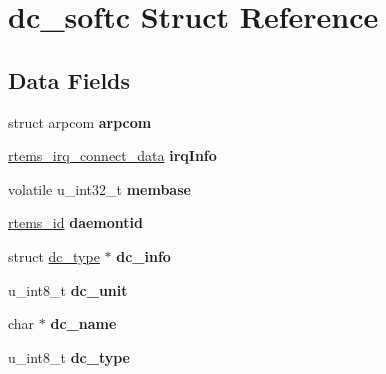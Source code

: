 \hypertarget{structdc__softc}{}\section{dc\+\_\+softc Struct Reference}
\label{structdc__softc}
\subsection*{Data Fields}
\begin{DoxyCompactItemize}
\item 
\mbox{\label{structdc__softc_aa35ea145016c40617c2cdd04aea78a62}} 
struct arpcom {\bfseries arpcom}
\item 
\mbox{\label{structdc__softc_ad37829419b117504c1aa75872a95597e}} 
\mbox{\hyperlink{struct____rtems__irq__connect__data____}{rtems\+\_\+irq\+\_\+connect\+\_\+data}} {\bfseries irq\+Info}
\item 
\mbox{\label{structdc__softc_a930f19a4864640438a67796719998ba3}} 
volatile u\+\_\+int32\+\_\+t {\bfseries membase}
\item 
\mbox{\label{structdc__softc_aa2291f670d3dc73ed4e9a0759e888a1b}} 
\mbox{\hyperlink{group__ClassicTasks_gab20892b814dced7dd4e5b9bf42becd57}{rtems\+\_\+id}} {\bfseries daemontid}
\item 
\mbox{\label{structdc__softc_a5ac480bf3c4cf28caa91520c3e803d75}} 
struct \mbox{\hyperlink{structdc__type}{dc\+\_\+type}} $\ast$ {\bfseries dc\+\_\+info}
\item 
\mbox{\label{structdc__softc_a162cec5bac6532cad9b9261798697397}} 
u\+\_\+int8\+\_\+t {\bfseries dc\+\_\+unit}
\item 
\mbox{\label{structdc__softc_a6cdd6e257d97594e2040c2e62990576b}} 
char $\ast$ {\bfseries dc\+\_\+name}
\item 
\mbox{\label{structdc__softc_a5568a6785da862fa54bd1ce62a60c159}} 
u\+\_\+int8\+\_\+t {\bfseries dc\+\_\+type}
\item 
\mbox{\label{structdc__softc_a5806249a64e60d11284c2e04e4e5177e}} 

\end{DoxyCompactItemize}
